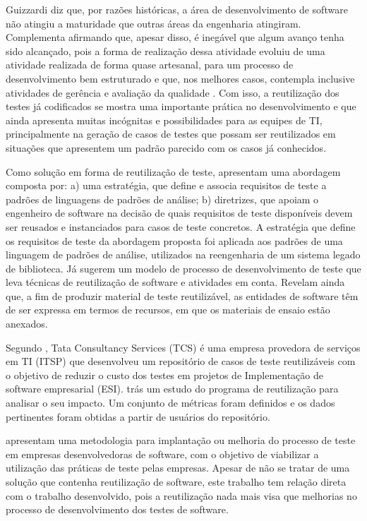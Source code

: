 \documentclass[tg]{mdtufsm}
\begin{document}
Guizzardi \citeyearpar{guizzardi2000desenvolvimento} diz que, por razões históricas, a área de desenvolvimento de software não atingiu a maturidade que outras áreas da engenharia atingiram. Complementa afirmando que, apesar disso, é inegável que algum avanço tenha sido alcançado, pois a forma de realização dessa atividade evoluiu de uma atividade realizada de forma quase artesanal, para um processo de
desenvolvimento bem estruturado e que, nos melhores casos, contempla inclusive atividades de gerência e avaliação da qualidade \cite{guizzardi2000desenvolvimento}.
Com isso, a reutilização dos testes já codificados se mostra uma importante prática no desenvolvimento e que ainda apresenta muitas incógnitas e possibilidades para as equipes de TI,
principalmente na geração de casos de testes que possam ser reutilizados em situações que apresentem um padrão parecido com os casos já conhecidos.

Como solução em forma de reutilização de teste, \cite{cagnin2004reuso} apresentam uma abordagem composta por: a) uma estratégia, que define e associa requisitos de teste a padrões de linguagens de padrões  de análise; b) diretrizes, que apoiam o engenheiro de software na decisão de quais requisitos de teste disponíveis devem ser reusados e instanciados para casos de teste concretos. A estratégia que define os requisitos de teste da abordagem proposta foi aplicada aos padrões de uma
linguagem de padrões de análise, utilizados na reengenharia de um sistema legado de biblioteca. Já \cite{karinsalo2004software} sugerem um modelo de processo de desenvolvimento de teste que leva técnicas de reutilização de software e atividades em conta. Revelam ainda que, a fim de produzir material de teste reutilizável, as entidades de software têm de ser expressa em termos de recursos, em que os materiais de ensaio estão anexados.

Segundo \cite{patel2014test}, Tata Consultancy Services (TCS)  é uma empresa provedora de serviços em TI (ITSP) que desenvolveu um repositório de casos de teste reutilizáveis com o objetivo de reduzir o custo dos testes em projetos de Implementação de software empresarial (ESI).\cite{patel2014test} trás um estudo do programa de reutilização para analisar o seu impacto. Um conjunto de métricas foram definidos e os dados pertinentes foram obtidas a partir de usuários do repositório.

\cite{crespo2004metodologia} apresentam uma metodologia para implantação ou melhoria do processo de teste em empresas desenvolvedoras de software, com o objetivo de viabilizar a utilização das práticas de teste pelas empresas. Apesar de não se tratar de uma solução que contenha reutilização de software, este trabalho tem relação direta com o trabalho desenvolvido, pois a reutilização nada mais visa que melhorias no processo de desenvolvimento dos testes de software.
\end{document}
